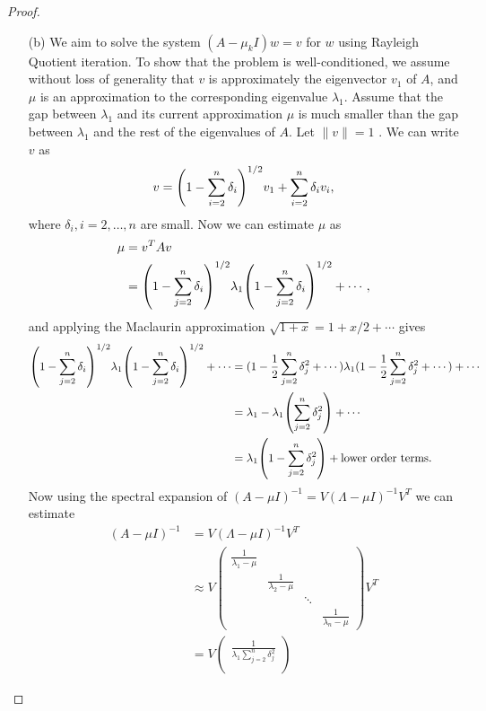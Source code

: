 \documentclass[12pt]{report}
\begin{document}
\begin{problem}
\begin{proof}
\begin{enumerate}
    \item [(b)]
    We aim to solve the system $(A - \mu_k I)w = v$ for $w$ using Rayleigh Quotient iteration. To show that the problem is well-conditioned, we assume without loss of generality that $v$ is approximately the eigenvector $v_1$ of $A$, and $\mu$ is an approximation to the corresponding eigenvalue $\lambda_1$. Assume that the gap between $\lambda_1$ and its current approximation $\mu$ is much smaller than the gap between $\lambda_1$ and the rest of the eigenvalues of $A$. Let $\|v\|=1$ . We can write $v$ as
    \[
         v = {\left(1 - \sum_{i=2}^n \delta_i\right)}^{1/2}v_1 + \sum_{i=2}^n\delta_i v_i,
    \]
    where $\delta_i, i=2,\dots,n$ are small. Now we can estimate $\mu$ as
    \begin{align*}
        \mu &= v^T A v\\
            &= {\left(1 - \sum_{j=2}^n \delta_i\right)}^{1/2} \lambda_1 {\left(1 - \sum_{j=2}^n \delta_i\right)}^{1/2} + \cdots,\\
    \end{align*}
    and applying the Maclaurin approximation $\sqrt{1 + x} = 1 + x/2 + \cdots$ gives
    \begin{align*}
        {\left(1 - \sum_{j=2}^n \delta_i\right)}^{1/2} \lambda_1 {\left(1 - \sum_{j=2}^n \delta_i\right)}^{1/2} + \cdots &= (1 - \frac{1}{2} \sum_{j=2}^n \delta_j^2 + \cdots)\lambda_1(1 - \frac{1}{2} \sum_{j=2}^n \delta_j^2 + \cdots) + \cdots \\
        &= \lambda_1 - \lambda_1{\left(\sum_{j=2}^n \delta_j^2\right)} + \cdots\\
        &= \lambda_1 {\left(1 - \sum_{j=2}^n \delta_j^2\right)} + \text{lower order terms.} 
    \end{align*}
    Now using the spectral expansion of $(A - \mu I)^{-1} = V(\Lambda - \mu I)^{-1}V^T$ we can estimate
    \begin{align*}
        (A - \mu I)^{-1} &= V(\Lambda - \mu I)^{-1}V^T\\
        &\approx V \begin{pmatrix}
            \frac{1}{\lambda_1 - \mu}\\
            &\frac{1}{\lambda_2 - \mu}\\
            &&\ddots\\
            &&&\frac{1}{\lambda_n - \mu}
        \end{pmatrix}V^T\\
        &= V \begin{pmatrix}
            \frac{1}{\lambda_1 \sum_{j=2}^n \delta_j^2}\\

\end{pmatrix}
\end{align*}
\end{enumerate}
\end{proof}
\end{problem}
\end{document}
